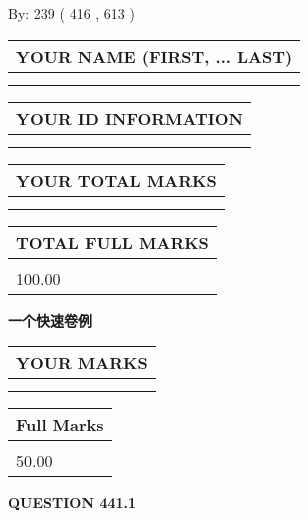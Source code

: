 \documentclass{ctexart}
\begin{document}
   
\hspace{1.0in} By: 
 239 ( 416 ,  613 )
   
   
   
   
\newpage 
\setcounter{page}{ 
   441001 } 
   
   
   
   
\noindent\begin{tabular}{|l|}
\hline
YOUR NAME (FIRST, ... LAST)  \\
\hline
 \\ 
 \\ 
\hline
\end{tabular}
\hspace{0.05in} \begin{tabular}{|l|}
\hline
 YOUR   ID   INFORMATION  \\
\hline
 \\ 
 \\ 
\hline
\end{tabular}
   
   
\vspace{0.2in}\noindent\begin{tabular}{|l|}
\hline
YOUR TOTAL MARKS  \\
\hline
 \\ 
 \\ 
\hline
\end{tabular}
\hspace{0.05in} \begin{tabular}{|l|}
\hline
TOTAL FULL MARKS  \\
\hline
 \\ 
100.00 \\
\hline
\end{tabular}
   
   
 \vspace{0.2in}
{\LARGE {\textbf{ 一个快速卷例}}}
   
   
  
\vspace{0.2in}
  
\noindent\begin{tabular}{|l|}
\hline
 YOUR MARKS  \\
\hline
 \\ 
 \\ 
\hline
\end{tabular}
\hspace{0.05in} \begin{tabular}{|l|}
\hline
 Full Marks  \\
\hline
 \\ 
50.00 \\
\hline
\end{tabular}
{\textbf{\Large{QUESTION
441.1 
}}}
  
\end{document}
